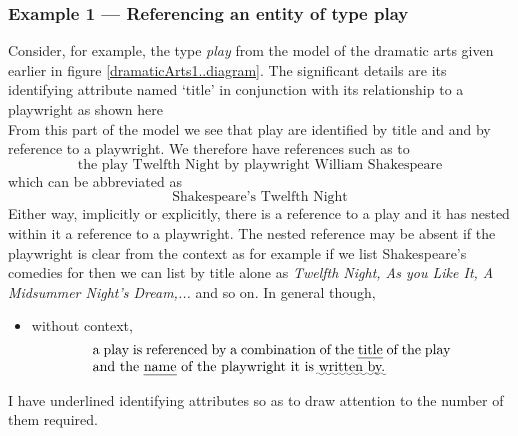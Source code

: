 \subsubsection*{Example 1 --- Referencing an entity of type play}
Consider, for example, the type \textit{play} from the model of the dramatic arts given earlier in figure \ref{dramaticArts1..diagram}. The significant details are its identifying attribute named `title' 
in conjunction with its relationship to a playwright
as shown here 
\begin{equation*}

\end{equation*}
From this part of the model we see that play are identified by title and
and by reference to a playwright.
\mynote
We therefore have references such as to
\begin{equation}
\mbox{the play Twelfth Night by playwright William Shakespeare}
\end{equation}
which can be abbreviated as
\begin{equation}
\mbox{Shakespeare's Twelfth Night}
\end{equation}
Either way, implicitly or explicitly, there is a reference to a play and it has 
nested within it a reference to a playwright.
The nested reference may be absent if the playwright is clear from the context as for example if we list Shakespeare's comedies for then we can list by title alone as \textit{Twelfth Night, As you Like It,
A Midsummer Night's Dream,...} and so on.
In general though,
\begin{itemize} 
\item without context, 
\begin{equation} 
\label{absolutePlayReferencing}
\text{\parbox{9cm}{a  play 
is referenced by a combination of the \uline{title} of the play and the \uline{name} of the playwright it is \uwave{written by.}}}
\end{equation}
\end{itemize}
I have underlined  identifying attributes so as to draw attention to the number of them required.

